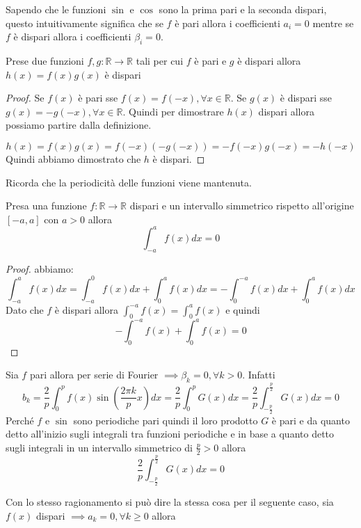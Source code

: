 Sapendo che le funzioni $\sin$ e $\cos$ sono la prima pari e la seconda dispari,
questo intuitivamente significa che se $f$ è pari allora i coefficienti $a_i= 0$
mentre se $f$ è dispari allora i coefficienti $\beta_i = 0$. 


\begin{nota}
    Prese due funzioni $f,g:\mathbb{R}\to \mathbb{R}$ tali per cui $f$ è pari e 
    $g$ è dispari allora $h(x)=f(x)g(x)$ è dispari
    \begin{proof}
        Se $f(x)$ è pari sse $f(x) = f(-x),\forall x\in \mathbb{R}$.
        Se $g(x)$ è dispari sse $g(x) = -g(-x),\forall x\in \mathbb{R}$. Quindi 
        per dimostrare $h(x)$ dispari allora possiamo partire dalla definizione.

        $$h(x) = f(x)g(x) = f(-x) (-g(-x)) = - f(-x)g(-x) = -h(-x)$$
        Quindi abbiamo dimostrato che $h$ è dispari.
    \end{proof}
\end{nota}

Ricorda che la periodicità delle funzioni viene mantenuta.

\begin{teorema}
    Presa una funzione $f:\mathbb{R}\to \mathbb{R}$ dispari e un intervallo simmetrico 
    rispetto all'origine $[-a,a]$ con $a>0$ allora 
    $$\int_{-a}^{a} f(x)dx = 0$$
    \begin{proof}
        abbiamo:
        $$\int_{-a}^{a} f(x)dx = \int_{-a}^{0} f(x)dx + \int_{0}^{a} f(x)dx = -\int_{0}^{-a} f(x) dx+ \int_{0}^{a} f(x)dx$$
        Dato che $f$ è dispari allora $ \int_{0}^{-a} f(x) = \int_{0}^{a} f(x)$ e quindi
        $$-\int_{0}^{-a} f(x) + \int_{0}^{a} f(x) = 0$$
    \end{proof}
\end{teorema}

Sia $f$ pari allora per serie di Fourier $\implies\beta_k= 0, \forall k>0 $.
Infatti 
$$b_k = \frac{2}{p} \int_{0}^{p}f(x) \sin (\frac{2\pi k}{p}x)dx =\frac{2}{p} \int_{0}^{p}G(x)dx =\frac{2}{p} \int_{-\frac{p}{2}}^{\frac{p}{2}}G(x)dx = 0$$ 
Perché $f$ e $\sin$ sono periodiche pari quindi il loro prodotto $G$ è pari e da
quanto detto all'inizio sugli integrali tra funzioni periodiche e in base a quanto 
detto sugli integrali in un intervallo simmetrico di $\frac{p}{2}>0$ allora 
$$\frac{2}{p} \int_{-\frac{p}{2}}^{\frac{p}{2}}G(x)dx = 0$$

Con lo stesso ragionamento si può dire la stessa cosa per il seguente caso,
sia $f(x)$ dispari $\implies a_k=0,\forall k\ge 0$ allora

